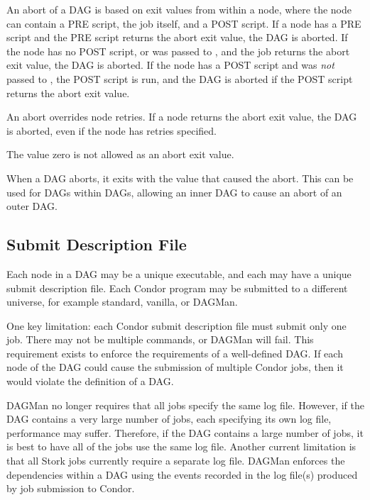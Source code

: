 An abort of a DAG is based on exit values from
within a node, 
where the node can contain
a PRE script, the job itself, and a POST script.
If a node has a PRE script and the PRE
script returns the abort exit value, the DAG is aborted.
If the node has no POST script, or  was passed to
,
and the job returns the abort exit value,
the DAG is aborted.
If the node has a POST script and  was \emph{not} passed
to ,
the POST script is run,
and the DAG is aborted if the POST script returns
the abort exit value.

An abort overrides node retries. 
If a node returns the abort exit value,
the DAG is aborted,
even if the node has retries specified.

The value zero is not allowed as an abort exit value.

When a DAG aborts, it exits with the value that caused the abort.
This can be used for DAGs within DAGs,
allowing an inner DAG to cause an abort of an outer DAG.

\subsection{Submit Description File}

Each node in a DAG may be a unique executable, and each may have a unique
submit description file.
Each Condor program may be submitted to a different universe,
for example standard,
vanilla, or DAGMan.

One key limitation:
each Condor submit description file must submit only one job.
There may not be multiple  commands, or DAGMan will fail.
This requirement exists to enforce the requirements of a well-defined DAG.
If each node of the DAG could cause the submission of multiple
Condor jobs, then it would violate the definition of a DAG.

DAGMan no longer requires that all jobs specify the same log file.
However, if the DAG contains a very large number of jobs, each
specifying its own log file, performance may suffer.  Therefore,
if the DAG contains a large number of jobs, it is best to have
all of the jobs use the same log file.
Another current limitation is that all
Stork jobs currently require a separate log file.
DAGMan enforces the dependencies within a DAG
using the events recorded in the
log file(s) produced by job submission to Condor.

